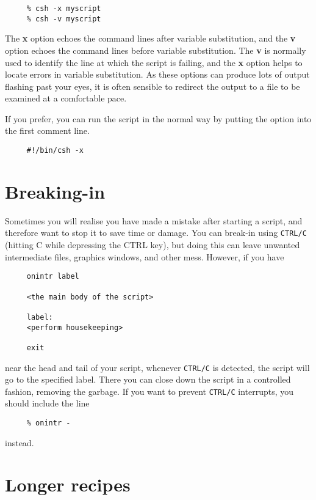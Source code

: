 \small
\begin{verbatim}
     % csh -x myscript
     % csh -v myscript
\end{verbatim}
\normalsize
The {\bf x} option echoes the command lines after variable substitution,
and the {\bf v} option echoes the command lines before variable
substitution.  The {\bf v} is normally used to identify the line at
which the script is failing, and the {\bf x} option helps to locate
errors in variable substitution.  As these options can produce lots of
output flashing past your eyes, it is often sensible to redirect the
output to a file to be examined at a comfortable pace.

If you prefer, you can run the script in the normal way by putting the
option into the first comment line.

\small
\begin{verbatim}
     #!/bin/csh -x
\end{verbatim}
\normalsize

\section{Breaking-in
\label{sc4_se_break_in}}

Sometimes you will realise you have made a mistake after starting a
script, and therefore want to stop it to save time or damage.  You can
break-in using {\tt CTRL/C} (hitting C while depressing the CTRL key),
but doing this can leave unwanted intermediate files, graphics
windows, and other mess.  However, if you have

\small
\begin{verbatim}
     onintr label

     <the main body of the script>

     label:
     <perform housekeeping>

     exit
\end{verbatim}
\normalsize
near the head and tail of your script, whenever {\tt CTRL/C} is
detected, the script will go to the specified label.  There you can
close down the script in a controlled fashion, removing the garbage.  If
you want to prevent {\tt CTRL/C} interrupts, you should include the line

\small
\begin{verbatim}
     % onintr -
\end{verbatim}
\normalsize
instead.

\newpage
\section{Longer recipes
\label{sc4_se_long_recipes}}

